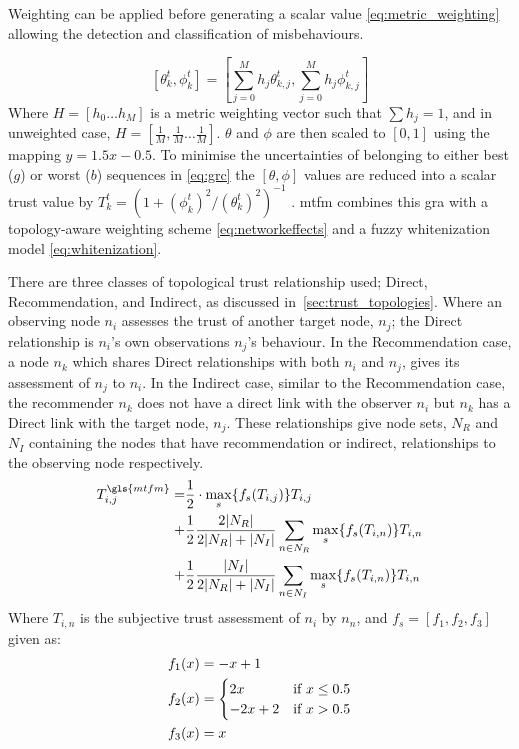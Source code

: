 Weighting can be applied before generating a scalar value \eqref{eq:metric_weighting} allowing the detection and classification of misbehaviours.

%
\begin{equation}
  \label{eq:metric_weighting}
  [\theta_k^t, \phi_k^t] = \left[\sum_{j=0}^M h_j \theta_{k,j}^t,\sum_{j=0}^M h_j \phi_{k,j}^t \right]
\end{equation}
%
Where $H=[h_0\dots h_M]$ is a metric weighting vector such that $\sum h_j = 1$, and in unweighted case, $H=[\frac{1}{M},\frac{1}{M}\dots\frac{1}{M}]$.
$\theta$ and $\phi$ are then scaled to $[0,1]$ using the mapping $y = 1.5 x - 0.5$.
To minimise the uncertainties of belonging to either best ($g$) or worst ($b$) sequences in \eqref{eq:grc} the $[\theta,\phi]$ values are reduced into a scalar trust value by $T_k^t = ({1+{(\phi_k^t)^2}/{(\theta_k^t)^2}})^{-1}$ \cite{Hong2010}.
\gls{mtfm} combines this \gls{gra} with a topology-aware weighting scheme \eqref{eq:networkeffects} and a fuzzy whitenization model \eqref{eq:whitenization}.

There are three classes of topological trust relationship used; Direct, Recommendation, and Indirect, as discussed in~\autoref{sec:trust_topologies}.
Where an observing node $n_i$ assesses the trust of another target node, $n_j$; the Direct relationship is $n_i$'s own observations $n_j$'s behaviour.
In the Recommendation case, a node $n_k$ which shares Direct relationships with both $n_i$ and $n_j$, gives its assessment of $n_j$ to $n_i$.
In the Indirect case, similar to the Recommendation case, the recommender $n_k$ does not have a direct link with the observer $n_i$ but $n_k$ has a Direct link with the target node, $n_j$.
These relationships give node sets, $N_R$ and $N_I$ containing the nodes that have recommendation or indirect, relationships to the observing node respectively.
%
\begin{align}
  \label{eq:networkeffects}
  T_{i,j}^{\gls{mtfm}}=&\frac{1}{2} \cdot \max_s\{f_s(T_{i,j})\} T_{i,j}\\ \notag
  +&\frac{1}{2} \frac{2|N_R| }{2|N_R| + |N_I|}\sum_{n \in N_R} \max_s\{f_s(T_{i,n})\} T_{i,n}\\ \notag
  +&\frac{1}{2} \frac{|N_I| }{2|N_R| + |N_I|}\sum_{n \in N_I} \max_s\{f_s(T_{i,n})\} T_{i,n} 
\end{align}
Where $T_{i,n}$ is the subjective trust assessment of $n_i$ by $n_n$, and $f_s = [ f_1,f_2, f_3]$ given as:
\begin{align}
  \label{eq:whitenization}
  f_1(x)&= -x+1\notag\\
  f_2(x)&= 
  \begin{cases}
    2x & \text{if }x\leq 0.5\\
    -2x+2 & \text{if }x>0.5
  \end{cases}\\
  f_3(x)&= x\notag
\end{align}
%

